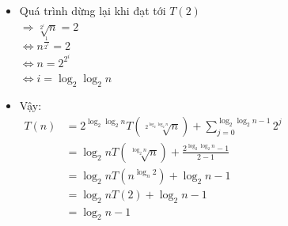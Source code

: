 \documentclass[12pt, letterpaper]{article}
\begin{document}
\begin{itemize}[label=-]
	\item Quá trình dừng lại khi đạt tới $ T(2) $ \\
	      $ \Rightarrow \sqrt[2^i]{n} = 2 $ \\
	      $ \Leftrightarrow n^\frac{1}{2^i} = 2 $ \\
	      $ \Leftrightarrow n = 2^{2^i} $ \\
	      $ \Leftrightarrow i = \log_2\log_2n $
	\item Vậy:\\
	      $ \begin{aligned}
			      T(n) & = 2^{\log_2\log_2n} T(\sqrt[2^{\log_2\log_2n}]{n}) + \sum_{j = 0}^{\log_2\log_2n - 1}2^j \\
			           & = \log_2n T(\sqrt[\log_2n]{n}) + \frac{2^{\log_2\log_2n} - 1}{2 - 1}                     \\
			           & = \log_2n T(n^{\log_n2}) + \log_2n - 1                                                   \\
			           & = \log_2n T(2) + \log_2n - 1                                                             \\
			           & = \log_2n - 1                                                                            \\
		      \end{aligned} $
\end{itemize}
\end{document}
